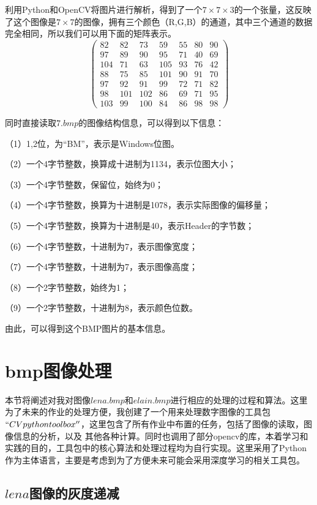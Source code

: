\documentclass[UTF8]{ctexart}
\begin{document}
利用Python和OpenCV将图片进行解析，得到了一个$7\times7\times3$的一个张量，这反映了这个图像是$7\times7$的图像，拥有三个颜色（R,G,B）的通道，其中三个通道的数据完全相同，所以我们可以用下面的矩阵表示。
\[\left( \begin{array}{ccccccc}
82  & 82  & 73  & 59  & 55  & 80  & 90 \\
97  & 89  & 90  & 95  & 71  & 40  & 69 \\
104 & 71  & 63  & 105 & 93  & 76  & 42 \\
88  & 75  & 85  & 101 & 90  & 91  & 70 \\
97  & 92  & 91  & 99  & 72  & 71  & 82 \\
98  & 101 & 102 & 86  & 69  & 71  & 95 \\
103 & 99  & 100 & 84  & 86  & 98  & 98 
\end{array} \right)\]

同时直接读取$7.bmp$的图像结构信息，可以得到以下信息：

（1）1,2位，为``BM''，表示是Windows位图。

（2）一个4字节整数，换算成十进制为1134，表示位图大小； 

（3）一个4字节整数，保留位，始终为0； 

（4）一个4字节整数，换算为十进制是1078，表示实际图像的偏移量； 

（5）一个4字节整数，换算为十进制是40，表示Header的字节数； 

（6）一个4字节整数，十进制为7，表示图像宽度； 

（7）一个4字节整数，十进制为7，表示图像高度； 

（8）一个2字节整数，始终为1； 

（9）一个2字节整数，十进制为8，表示颜色位数。

由此，可以得到这个BMP图片的基本信息。

\section{bmp图像处理}

本节将阐述对我对图像$lena.bmp$和$elain.bmp$进行相应的处理的过程和算法。这里为了未来的作业的处理方便，我创建了一个用来处理数字图像的工具包$``CV python toolbox''$，这里包含了所有作业中布置的任务，包括了图像的读取，图像信息的分析，以及
其他各种计算。同时也调用了部分opencv的库，本着学习和实践的目的，工具包中的核心算法和处理过程均为自行实现。这里采用了Python作为主体语言，主要是考虑到为了方便未来可能会采用深度学习的相关工具包。

\subsection{$lena$图像的灰度递减}
\end{document}

